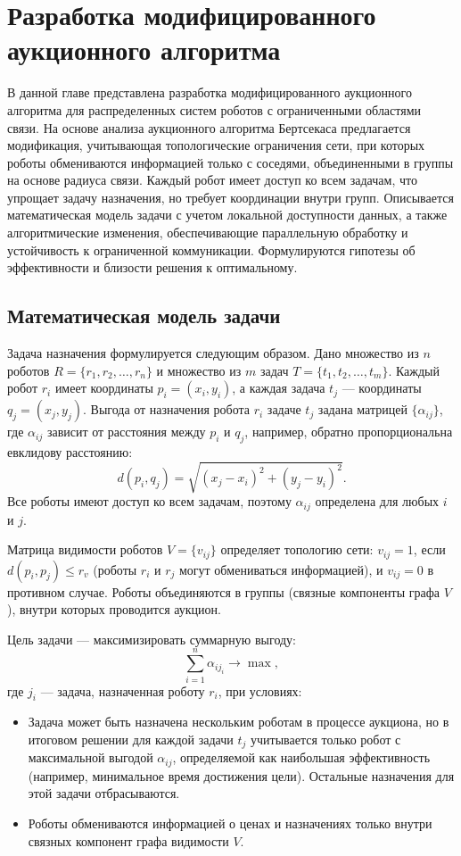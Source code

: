 \chapter{Разработка модифицированного аукционного алгоритма}
\label{ch2}

В данной главе представлена разработка модифицированного аукционного алгоритма для распределенных систем роботов с ограниченными областями связи. На основе анализа аукционного алгоритма Бертсекаса \cite{bertsekas1990} предлагается модификация, учитывающая топологические ограничения сети, при которых роботы обмениваются информацией только с соседями, объединенными в группы на основе радиуса связи. Каждый робот имеет доступ ко всем задачам, что упрощает задачу назначения, но требует координации внутри групп. Описывается математическая модель задачи с учетом локальной доступности данных, а также алгоритмические изменения, обеспечивающие параллельную обработку и устойчивость к ограниченной коммуникации. Формулируются гипотезы об эффективности и близости решения к оптимальному.

\section{Математическая модель задачи}

Задача назначения формулируется следующим образом. Дано множество из \( n \) роботов \( R = \{r_1, r_2, \ldots, r_n\} \) и множество из \( m \) задач \( T = \{t_1, t_2, \ldots, t_m\} \). Каждый робот \( r_i \) имеет координаты \( p_i = (x_i, y_i) \), а каждая задача \( t_j \) --- координаты \( q_j = (x_j, y_j) \). Выгода от назначения робота \( r_i \) задаче \( t_j \) задана матрицей \( \{\alpha_{ij}\} \), где \( \alpha_{ij} \) зависит от расстояния между \( p_i \) и \( q_j \), например, обратно пропорциональна евклидову расстоянию:
\[
d(p_i, q_j) = \sqrt{(x_j - x_i)^2 + (y_j - y_i)^2}.
\]
Все роботы имеют доступ ко всем задачам, поэтому \( \alpha_{ij} \) определена для любых \( i \) и \( j \).

Матрица видимости роботов \( V = \{v_{ij}\} \) определяет топологию сети: \( v_{ij} = 1 \), если \( d(p_i, p_j) \leq r_v \) (роботы \( r_i \) и \( r_j \) могут обмениваться информацией), и \( v_{ij} = 0 \) в противном случае. Роботы объединяются в группы (связные компоненты графа \( V \)), внутри которых проводится аукцион.

Цель задачи --- максимизировать суммарную выгоду:
\[
\sum_{i=1}^n \alpha_{i j_i} \to \max,
\]
где \( j_i \) --- задача, назначенная роботу \( r_i \), при условиях:
\begin{itemize}
    \item Задача может быть назначена нескольким роботам в процессе аукциона, но в итоговом решении для каждой задачи \( t_j \) учитывается только робот с максимальной выгодой \( \alpha_{ij} \), определяемой как наибольшая эффективность (например, минимальное время достижения цели). Остальные назначения для этой задачи отбрасываются.
    \item Роботы обмениваются информацией о ценах и назначениях только внутри связных компонент графа видимости \( V \).
\end{itemize}


